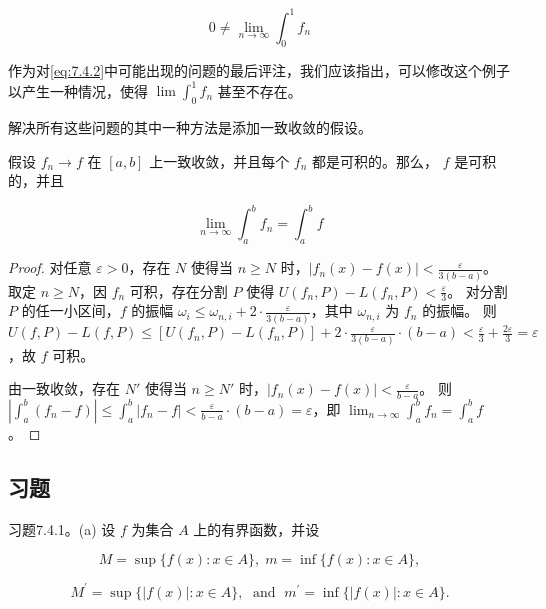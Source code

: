 \[
0 \neq  \mathop{\lim }\limits_{{n \rightarrow  \infty }}{\int }_{0}^{1}{f}_{n}
\]

作为对\ref{eq:7.4.2}中可能出现的问题的最后评注，我们应该指出，可以修改这个例子以产生一种情况，使得 \(\lim {\int }_{0}^{1}{f}_{n}\) 甚至不存在。

解决所有这些问题的其中一种方法是添加一致收敛的假设。

\begin{Thm}
  \label{thm:7.4.4}
  假设 \({f}_{n} \rightarrow  f\) 在 \(\left\lbrack  {a,b}\right\rbrack\) 上一致收敛，并且每个 \({f}_{n}\) 都是可积的。那么， \(f\) 是可积的，并且

\[
\mathop{\lim }\limits_{{n \rightarrow  \infty }}{\int }_{a}^{b}{f}_{n} = {\int }_{a}^{b}f
\]
\end{Thm}

\begin{proof}
  
对任意 \(\varepsilon > 0\)，存在 \(N\) 使得当 \(n \geq N\) 时，\(|f_{n}(x) - f(x)| < \frac{\varepsilon}{3(b-a)}\)。  
取定 \(n \geq N\)，因 \({f}_{n}\) 可积，存在分割 \(P\) 使得 \(U(f_{n}, P) - L(f_{n}, P) < \frac{\varepsilon}{3}\)。  
对分割 \(P\) 的任一小区间，\(f\) 的振幅 \(\omega_{i} \leq \omega_{n,i} + 2 \cdot \frac{\varepsilon}{3(b-a)}\)，其中 \(\omega_{n,i}\) 为 \({f}_{n}\) 的振幅。  
则 \(U(f, P) - L(f, P) \leq [U(f_{n}, P) - L(f_{n}, P)] + 2 \cdot \frac{\varepsilon}{3(b-a)} \cdot (b-a) < \frac{\varepsilon}{3} + \frac{2\varepsilon}{3} = \varepsilon\)，故 \(f\) 可积。

由一致收敛，存在 \(N'\) 使得当 \(n \geq N'\) 时，\(|f_{n}(x) - f(x)| < \frac{\varepsilon}{b-a}\)。  
则 \(\left| \int_{a}^{b} (f_{n} - f) \right| \leq \int_{a}^{b} |f_{n} - f| < \frac{\varepsilon}{b-a} \cdot (b-a) = \varepsilon\)，即 \(\lim_{n \to \infty} \int_{a}^{b} f_{n} = \int_{a}^{b} f\)。
\end{proof}


\subsection{习题}

习题7.4.1。(a) 设 \(f\) 为集合 \(A\) 上的有界函数，并设

\[
M = \sup \{ f\left( x\right)  : x \in  A\} ,\;m = \inf \{ f\left( x\right)  : x \in  A\} ,
\]

\[
{M}^{\prime } = \sup \{ \left| {f\left( x\right) }\right|  : x \in  A\} ,\;\text{ and }\;{m}^{\prime } = \inf \{ \left| {f\left( x\right) }\right|  : x \in  A\} .
\]

